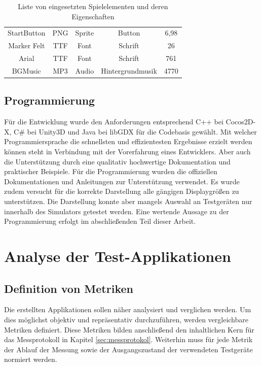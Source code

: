 \begin{table}[htbp]
{\begin{tabular}{ccccc}
			\rowcolor[HTML]{C0C0C0} 
			{\color[HTML]{000000} StartButton} & {\color[HTML]{000000} PNG}      & {\color[HTML]{000000} Sprite}        & {\color[HTML]{000000} Button}           & {\color[HTML]{000000}6,98}           \\
			{\color[HTML]{000000} Marker Felt} & {\color[HTML]{000000} TTF}      & {\color[HTML]{000000} Font}          & {\color[HTML]{000000} Schrift}          & {\color[HTML]{000000}26}           \\
			\rowcolor[HTML]{C0C0C0} 
			{\color[HTML]{000000} Arial}       & {\color[HTML]{000000} TTF}      & {\color[HTML]{000000} Font}          & {\color[HTML]{000000} Schrift}          & {\color[HTML]{000000}761}           \\
			{\color[HTML]{000000} BGMusic}     & {\color[HTML]{000000} MP3}      & {\color[HTML]{000000} Audio}         & {\color[HTML]{000000} Hintergrundmusik} & {\color[HTML]{000000}4770}          
		\end{tabular}
	}
	\caption{Liste von eingesetzten Spielelementen und deren Eigenschaften}
	\label{spiel_komponenten}
\end{table}

\section{Programmierung}
Für die Entwicklung wurde den Anforderungen entsprechend C++ bei Cocos2D-X, C\# bei Unity3D und Java bei libGDX für die Codebasis gewählt. Mit welcher Programmiersprache die schnellsten und effizientesten Ergebnisse erzielt werden können steht in Verbindung mit der Vorerfahrung eines Entwicklers. Aber auch die Unterstützung durch eine qualitativ hochwertige Dokumentation und praktischer Beispiele. Für die Programmierung wurden die offiziellen Dokumentationen und Anleitungen zur Unterstützung verwendet. Es wurde zudem versucht für die korrekte Darstellung alle gängigen Displaygrößen zu unterstützen. Die Darstellung konnte aber mangels Auswahl an Testgeräten nur innerhalb des Simulators getestet werden. Eine wertende Aussage zu der Programmierung erfolgt im abschließenden Teil dieser Arbeit.


\chapter{Analyse der Test-Applikationen}

\section{Definition von Metriken}
Die erstellten Applikationen sollen näher analysiert und verglichen werden. Um dies möglichst objektiv und repräsentativ durchzuführen, werden vergleichbare Metriken definiert. Diese Metriken bilden anschließend den inhaltlichen Kern für das Messprotokoll in Kapitel \ref{sec:messprotokol}. Weiterhin muss für jede Metrik der Ablauf der Messung sowie der Ausgangszustand der verwendeten Testgeräte normiert werden.

